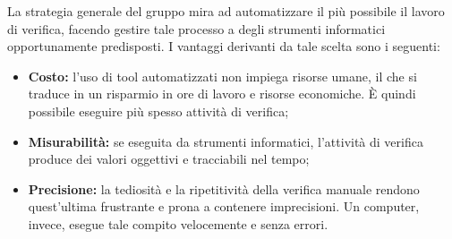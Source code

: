 La strategia generale del gruppo \gruppo \space mira ad automatizzare il più possibile il lavoro di verifica, facendo gestire tale processo a degli strumenti informatici opportunamente predisposti. \newline
I vantaggi derivanti da tale scelta sono i seguenti:
\begin{itemize}
    \item \textbf{Costo:} l'uso di {tool} automatizzati non impiega {risorse} umane, il che si traduce in un risparmio in ore di lavoro e risorse economiche.  \`E quindi possibile eseguire più spesso attività di verifica;
    \item \textbf{Misurabilità:} se eseguita da strumenti informatici, l'attività di verifica produce dei valori oggettivi e tracciabili nel tempo;
    \item \textbf{Precisione:} la tediosità e la ripetitività della verifica manuale rendono quest'ultima frustrante e prona a contenere imprecisioni. Un computer, invece, esegue tale compito velocemente e senza errori.
\end{itemize}
